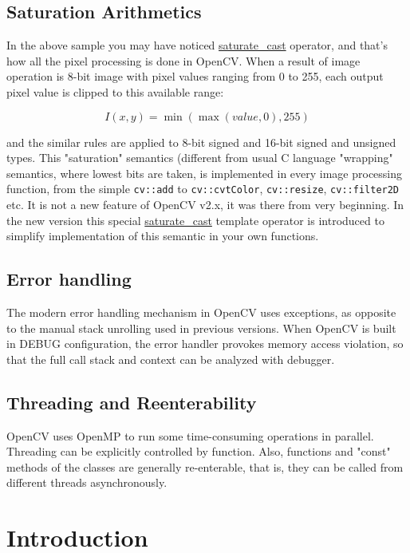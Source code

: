 \section{Saturation Arithmetics}

In the above sample you may have noticed \hyperref[saturatecast]{saturate\_cast} operator, and that's how all the pixel processing is done in OpenCV. When a result of image operation is 8-bit image with pixel values ranging from 0 to 255, each output pixel value is clipped to this available range:

\[
I(x,y)=\min(\max(value, 0), 255)
\]

and the similar rules are applied to 8-bit signed and 16-bit signed and unsigned types. This "saturation" semantics (different from usual C language "wrapping" semantics, where lowest bits are taken, is implemented in every image processing function, from the simple \texttt{cv::add} to 
\texttt{cv::cvtColor}, \texttt{cv::resize}, \texttt{cv::filter2D} etc.
It is not a new feature of OpenCV v2.x, it was there from very beginning. In the new version this special \hyperref[saturatecast]{saturate\_cast} template operator is introduced to simplify implementation of this semantic in your own functions.


\section{Error handling}

The modern error handling mechanism in OpenCV uses exceptions, as opposite to the manual stack unrolling used in previous versions. When OpenCV is built in DEBUG configuration, the error handler provokes memory access violation, so that the full call stack and context can be analyzed with debugger.

\section{Threading and Reenterability}

OpenCV uses OpenMP to run some time-consuming operations in parallel. Threading can be explicitly controlled by  function. Also, functions and "const" methods of the classes are generally re-enterable, that is, they can be called from different threads asynchronously.

\fi

\ifPy
\chapter{Introduction}

